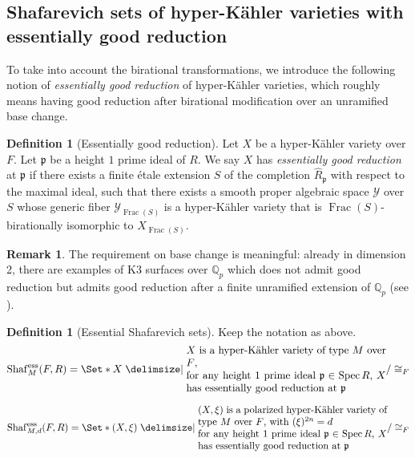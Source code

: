 \documentclass[11pt,reqno,oneside]{amsart}
\numberwithin{equation}{section}
\theoremstyle{definition}
\newtheorem{definition}[theorem]{Definition}
\newtheorem{remark}[theorem]{Remark}
\DeclareMathOperator{\Spec}{Spec}
\DeclareMathOperator{\ess}{ess}
\DeclareMathOperator{\Frac}{Frac}
\newcommand{\Sha}{\mathrm{Shaf}}
\newcommand{\QQ}{\mathbb{Q}}
\newcommand{\p}{\mathfrak{p}}
\begin{document}
\subsection{Shafarevich sets of hyper-Kähler varieties with essentially good reduction} To take into account the birational transformations, we introduce the following notion of \textit{essentially good reduction} of hyper-Kähler varieties, which roughly means having good reduction after birational modification over an unramified base change. 

\begin{definition}[Essentially good reduction]
\label{essentially good}
Let $X$ be a hyper-Kähler variety over $F$.
Let $\p$ be a height $1$ prime ideal of $R$.
We say $X$ has \textit{essentially good reduction} at $\p$ if
there exists a finite \'{e}tale extension $S$ of the completion $\widehat{R}_{\p}$ with respect to the maximal ideal, such that there exists a smooth proper algebraic space $\mathcal{Y}$ over $S$ whose generic fiber $\mathcal{Y}_{\Frac(S)}$ is a hyper-Kähler variety that is $\Frac(S)$-birationally isomorphic to $X_{\Frac(S)}$.
\end{definition}

\begin{remark}
The requirement on base change is meaningful: already in dimension 2, there are examples of K3 surfaces over $\QQ_{p}$ which does not admit good reduction but admits good reduction after a finite unramified extension of $\QQ_{p}$ (see \cite[Theorem 1.6]{LM18}).
\end{remark}

\begin{definition}[Essential Shafarevich sets]
Keep the notation as above.
\begin{equation}\label{essunpolHKset}
\Sha_{M}^{\ess}(F,R)=\Set*{ X\given 
\parbox{19em}{
$X$ is a hyper-Kähler variety of type $M$ over $F$,\\
 for any height $1$ prime ideal $\mathfrak{p}\in \Spec R$, $X$ has essentially good reduction at $\mathfrak{p}$}
}/ \cong_{F}
\end{equation}

\begin{equation}\label{esspolHKset}
\Sha_{M,d}^{\ess}(F,R)=\Set*{ (X, \xi)\given 
\parbox{19em}{
$(X, \xi)$ is a polarized hyper-Kähler variety of type $M$ over $F$, with
$(\xi)^{2n}=d$ \\
for any height $1$ prime ideal $\mathfrak{p}\in \Spec R$, $X$ has essentially good reduction at $\mathfrak{p}$
}
}/ \cong_{F}
\end{equation}
\end{definition}
\end{document}
